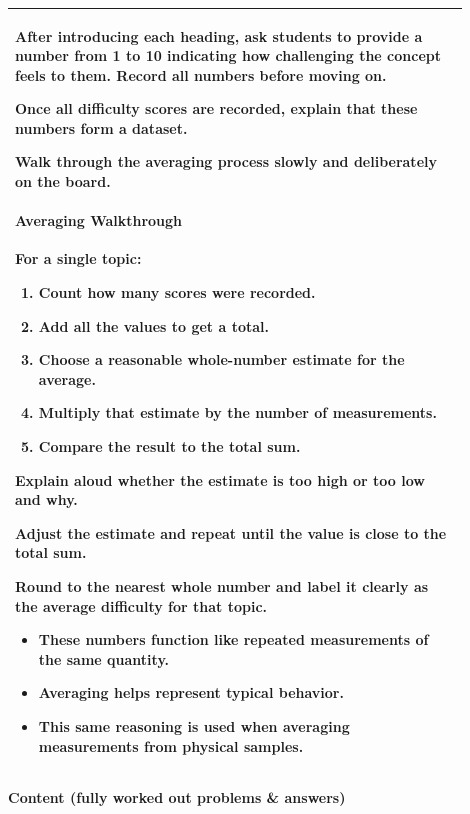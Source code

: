 \documentclass{article}
\begin{document}
\begin{tabular}{|p{0.9\linewidth}|}
\hline
After introducing each heading, ask students to provide a number from 1 to 10 indicating how challenging the concept feels to them. Record all numbers before moving on.

Once all difficulty scores are recorded, explain that these numbers form a dataset.

Walk through the averaging process slowly and deliberately on the board.

\paragraph{Averaging Walkthrough}
For a single topic:

\begin{enumerate}
    \item Count how many scores were recorded.
    \item Add all the values to get a total.
    \item Choose a reasonable whole-number estimate for the average.
    \item Multiply that estimate by the number of measurements.
    \item Compare the result to the total sum.
\end{enumerate}

Explain aloud whether the estimate is too high or too low and why.

Adjust the estimate and repeat until the value is close to the total sum.

Round to the nearest whole number and label it clearly as the average difficulty for that topic.

\begin{itemize}
    \item These numbers function like repeated measurements of the same quantity.
    \item Averaging helps represent typical behavior.
    \item This same reasoning is used when averaging measurements from physical samples.
\end{itemize} \\
\hline
\end{tabular}
\newpage








\noindent
{\large \textbf{Content (fully worked out problems \& answers)}} \\[0.2em]
\end{document}
